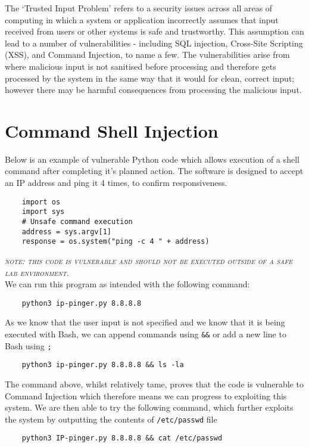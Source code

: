 
The `Trusted Input Problem' refers to a security issues across all areas of computing in which a system or application incorrectly assumes that input received from users or other systems is safe and trustworthy. This assumption can lead to a number of vulnerabilities - including SQL injection, Cross-Site Scripting (XSS), and Command Injection, to name a few. The vulnerabilities arise from where malicious input is not sanitised before processing and therefore gets processed by the system in the same way that it would for clean, correct input; however there may be harmful consequences from processing the malicious input. 

\section{Command Shell Injection}
Below is an example of vulnerable Python code which allows execution of a shell command after completing it's planned action. The software is designed to accept an IP address and ping it 4 times, to confirm responsiveness.
\begin{verbatim}
    import os
    import sys
    # Unsafe command execution
    address = sys.argv[1]
    response = os.system("ping -c 4 " + address)
\end{verbatim}
\textsc{\textit{note: this code is vulnerable and should not be executed outside of a safe lab environment.}}\\

We can run this program as intended with the following command:
\begin{verbatim}
    python3 ip-pinger.py 8.8.8.8
\end{verbatim}

As we know that the user input is not specified and we know that it is being executed with Bash, we can append commands using \verb|&&| or add a new line to Bash using \verb|;|
\begin{verbatim}
    python3 ip-pinger.py 8.8.8.8 && ls -la
\end{verbatim}

The command above, whilst relatively tame, proves that the code is vulnerable to Command Injection which therefore means we can progress to exploiting this system. We are then able to try the following command, which further exploits the system by outputting the contents of \verb|/etc/passwd| file
\begin{verbatim}
    python3 IP-pinger.py 8.8.8.8 && cat /etc/passwd
\end{verbatim}

